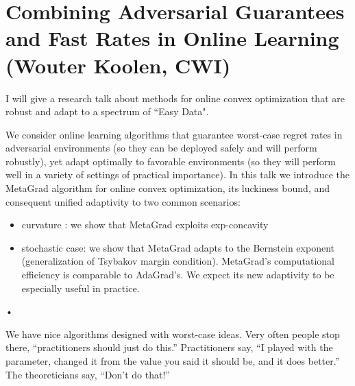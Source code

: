 \def\filepath{C:/Users/oldhe/Dropbox/Math/templates}






\pagestyle{fancy}
\chead{} 
\lfoot{} 
\cfoot{\thepage} 
\rfoot{} 
\renewcommand{\headrulewidth}{.3pt} 
\setlength\voffset{0in}
\setlength\textheight{648pt}






\section{Combining Adversarial Guarantees and Fast Rates in Online Learning (Wouter Koolen, CWI)}

I will give a research talk about methods for online convex optimization
that are robust and adapt to a spectrum of ``Easy Data".

We consider online learning algorithms that guarantee worst-case
regret rates in adversarial environments (so they can be deployed safely
and will perform robustly), yet adapt optimally to favorable
environments (so they will perform well in a variety of settings of
practical importance). In this talk we introduce the MetaGrad algorithm
for online convex optimization, its luckiness bound, and consequent
unified adaptivity to two common scenarios:
\begin{itemize}
\item
curvature : we show that MetaGrad exploits exp-concavity
\item
stochastic case: we show that MetaGrad adapts to the Bernstein 
exponent (generalization of Tsybakov margin condition). MetaGrad's
computational efficiency is comparable to AdaGrad's. We expect its new
adaptivity to be especially useful in practice.
\end{itemize}•

%
%

We have nice algorithms designed with worst-case ideas. Very often people stop there, ``practitioners should just do this.'' Practitioners say, ``I played with the parameter, changed it from the value you said it should be, and it does better.'' The theoreticians say, ``Don't do that!''

